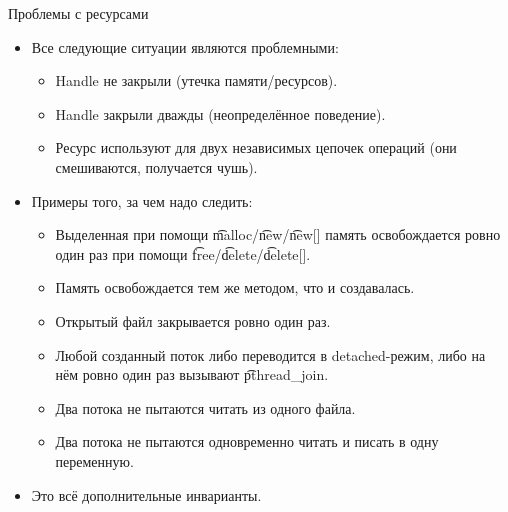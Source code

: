 \begin{frame}[t]{Проблемы с ресурсами}
	\begin{itemize}
		\item Все следующие ситуации являются проблемными:
			\begin{itemize}
				\item Handle не закрыли (утечка памяти/ресурсов).
				\item Handle закрыли дважды (неопределённое поведение).
				\item Ресурс используют для двух независимых цепочек операций (они смешиваются, получается чушь).
			\end{itemize}
		\item Примеры того, за чем надо следить:
			\begin{itemize}
				\item
					Выделенная при помощи \t{malloc}/\t{new}/\t{new[]} память
					освобождается ровно один раз при помощи \t{free}/\t{delete}/\t{delete[]}.
				\item
					Память освобождается тем же методом, что и создавалась.
				\item
					Открытый файл закрывается ровно один раз.
				\item
					Любой созданный поток либо переводится в detached-режим, либо на нём ровно один раз вызывают \t{pthread\_join}.
				\item
					Два потока не пытаются читать из одного файла.
				\item
					Два потока не пытаются одновременно читать и писать в одну переменную.
			\end{itemize}
		\item Это всё дополнительные инварианты.
	\end{itemize}
\end{frame}

